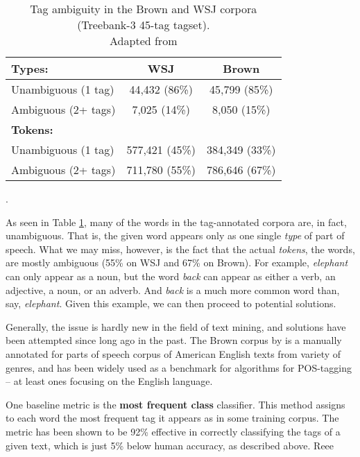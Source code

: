 \begin{table}[htbp]
    \centering
    \begin{tabular}{p{}cc}
        \toprule
        \textbf{Types:} & \textbf{WSJ} & \textbf{Brown} \\
        \midrule
        \quad Unambiguous (1 tag) &   44,432 (86\%) & 45,799 (85\%) \\
        \quad Ambiguous (2+ tags) & 7,025 (14\%)  & 8,050 (15\%) \\
        \midrule
        \textbf{Tokens:} & & \\
        \midrule
        \quad Unambiguous (1 tag) & 577,421 (45\%) &  384,349 (33\%) \\
        \quad Ambiguous (2+ tags) & 711,780 (55\%) & 786,646 (67\%) \\
        \bottomrule
    \end{tabular}
    \caption{Tag ambiguity in the Brown and WSJ corpora (Treebank-3 45-tag tagset). \\ Adapted from \cite{Jurafsky:2009:SLP:1214993}}.
    \label{tab:tokens_textbook}
\end{table}
As seen in Table \ref{tab:tokens_textbook}, many of the words in the tag-annotated corpora are, in fact, unambiguous. That is, the given word appears only as one single \textit{type} of part of speech. What we may miss, however, is the fact that the actual \textit{tokens}, the words, are mostly ambiguous (55\% on WSJ and 67\% on Brown). For example, \textit{elephant} can only appear as a noun, but the word \textit{back} can appear as either a verb, an adjective, a noun, or an adverb. And \textit{back} is a much more common word than, say, \textit{elephant}. Given this example, we can then proceed to potential solutions.

Generally, the issue is hardly new in the field of text mining, and solutions have been attempted since long ago in the past. The Brown corpus by \cite{francis1979brown} is a manually annotated for parts of speech corpus of American English texts from variety of genres, and has been widely used as a benchmark for algorithms for POS-tagging -- at least ones focusing on the English language. 

One baseline metric is the \textbf{most frequent class} classifier. This method assigns to each word the most frequent tag it appears as in some training corpus. The metric has been shown to be 92\% effective \citep{Jurafsky:2009:SLP:1214993} in correctly classifying the tags of a given text, which is just 5\% below human accuracy, as described above. 
Reee

